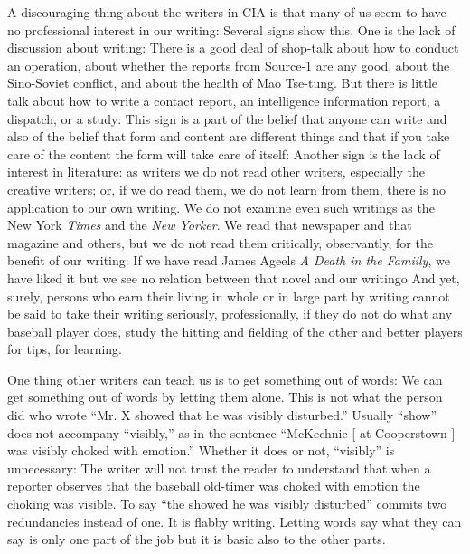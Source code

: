 \documentclass[
    oneside,
    11pt,
    draft
]{memoir}
\begin{document}
A discouraging thing about the writers in CIA is that many of us seem to have no professional interest in our writing: Several signs show this. One is the lack of discussion about writing: There is a good deal of shop-talk about how to conduct an operation, about whether the reports from Source-1 are any good, about the Sino-Soviet conflict, and about the health of Mao Tse-tung. But there is little talk about how to write a contact report, an intelligence information report, a dispatch, or a study: This sign is a part of the belief that anyone can write and also of the belief that form and content are different things and that if you take care of the content the form will take care of itself: Another sign is the lack of interest in literature: as writers we do not read other writers, especially the creative writers; or, if we do read them, we do not learn from them, there is no application to our own writing. We do not examine even such writings as the New York \emph{Times} and the \emph{New Yorker}. We read that newspaper and that magazine and others, but we do not read them critically, observantly, for the benefit of our writing: If we have read James Ageels \emph{A Death in the Famiily}, we have liked it but we see no relation between that novel and our writingo And yet, surely, persons who earn their living in whole or in large part by writing cannot be said to take their writing seriously, professionally, if they do not do what any baseball player does, study the hitting and fielding of the other and better players for tips, for learning.

One thing other writers can teach us is to get something out of words: We can get something out of words by letting them alone. This is not what the person did who wrote \enquote{Mr. X showed that he was visibly disturbed.} Usually \enquote{show} does not accompany \enquote{visibly,} as in the sentence \enquote{McKechnie [ at Cooperstown ] was visibly choked with emotion.} Whether it does or not, \enquote{visibly} is unnecessary: The writer will not trust the reader to understand that when a reporter observes that the baseball old-timer was choked with emotion the choking was visible. To say \enquote{the showed he was visibly disturbed} commits two redundancies instead of one. It is flabby writing. Letting words say what they can say is only one part of the job but it is basic also to the other parts.
\end{document}
